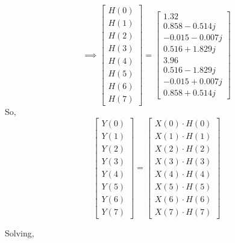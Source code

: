 \documentclass[journal,12pt,twocolumn]{IEEEtran}
\renewcommand\thesection{\arabic{section}}
\begin{document}
\begin{enumerate}[label=\thesection.\arabic*.,ref=\thesection.\theenumi]
\begin{equation}
\implies
\begin{bmatrix}
H(0) \\
H(1) \\
H(2) \\
H(3) \\
H(4) \\
H(5) \\
H(6) \\
H(7)
\end{bmatrix}
=
\begin{bmatrix}
1.32 \\
0.858 - 0.514j \\
-0.015-0.007j \\
0.516 +1.829j \\
3.96 \\
0.516 - 1.829j \\
-0.015+0.007j  \\
0.858 + 0.514j
\end{bmatrix}
\end{equation}
So,
\begin{equation}
\begin{bmatrix} 
Y(0) \\ Y(1) \\ Y(2) \\ Y(3) \\ Y(4) \\ Y(5) \\ Y(6) \\ Y(7) 
\end{bmatrix}
=
\begin{bmatrix}
X(0)\cdot H(0) \\ X(1)\cdot H(1) \\ X(2)\cdot H(2) \\ X(3)\cdot H(3) \\ X(4)\cdot H(4) \\ X(5)\cdot H(5) \\ X(6)\cdot H(6) \\ X(7)\cdot H(7)
\end{bmatrix}
\end{equation}

Solving,


\end{enumerate}
\end{document}
